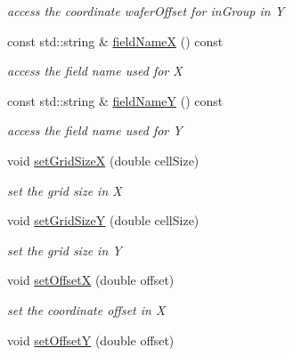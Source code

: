 \begin{DoxyCompactItemize}
\begin{DoxyCompactList}\small\item\em access the coordinate waferOffset for inGroup in Y \item\end{DoxyCompactList}\item 
const std::string \& \hyperlink{class_d_d4hep_1_1_d_d_segmentation_1_1_wafer_grid_x_y_a7f76cf7d5acf64796440862012b27851}{fieldNameX} () const 
\begin{DoxyCompactList}\small\item\em access the field name used for X \item\end{DoxyCompactList}\item 
const std::string \& \hyperlink{class_d_d4hep_1_1_d_d_segmentation_1_1_wafer_grid_x_y_ac2487159add159a35a9d19712641be0c}{fieldNameY} () const 
\begin{DoxyCompactList}\small\item\em access the field name used for Y \item\end{DoxyCompactList}\item 
void \hyperlink{class_d_d4hep_1_1_d_d_segmentation_1_1_wafer_grid_x_y_a890894a5afd02db5c888fba69c5489d7}{setGridSizeX} (double cellSize)
\begin{DoxyCompactList}\small\item\em set the grid size in X \item\end{DoxyCompactList}\item 
void \hyperlink{class_d_d4hep_1_1_d_d_segmentation_1_1_wafer_grid_x_y_a8330f514334f70de9b381170c3bcf8ef}{setGridSizeY} (double cellSize)
\begin{DoxyCompactList}\small\item\em set the grid size in Y \item\end{DoxyCompactList}\item 
void \hyperlink{class_d_d4hep_1_1_d_d_segmentation_1_1_wafer_grid_x_y_a7721c7a200c1893f1badcbc78e1319d8}{setOffsetX} (double offset)
\begin{DoxyCompactList}\small\item\em set the coordinate offset in X \item\end{DoxyCompactList}\item 
void \hyperlink{class_d_d4hep_1_1_d_d_segmentation_1_1_wafer_grid_x_y_a0db51fa22c800ca21f6c6c18b0740012}{setOffsetY} (double offset)

\end{DoxyCompactItemize}
